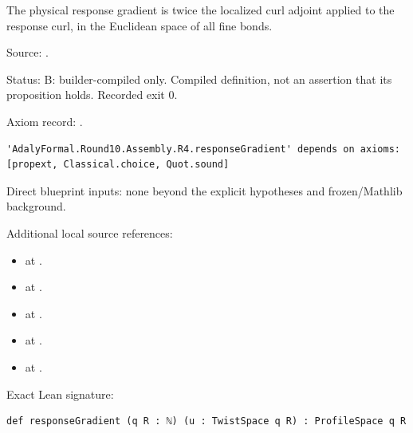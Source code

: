\begin{definition}[bp-168]
\label{bp-168}
\uses{}
\leanok
The physical response gradient is twice the localized curl adjoint applied to the response curl, in the Euclidean space of all fine bonds.

\par Source: \texttt{}.
\par Status: B: builder-compiled only. Compiled definition, not an assertion that its proposition holds. Recorded exit 0.
\par Axiom record: \texttt{}.
\begin{verbatim}
'AdalyFormal.Round10.Assembly.R4.responseGradient' depends on axioms: [propext, Classical.choice, Quot.sound]
\end{verbatim}
\par Direct blueprint inputs: none beyond the explicit hypotheses and frozen/Mathlib background.
\par Additional local source references:
\begin{itemize}
\item \texttt{} at \texttt{}.
\item \texttt{} at \texttt{}.
\item \texttt{} at \texttt{}.
\item \texttt{} at \texttt{}.
\item \texttt{} at \texttt{}.
\end{itemize}
\par Exact Lean signature:
\begin{verbatim}
def responseGradient (q R : ℕ) (u : TwistSpace q R) : ProfileSpace q R
\end{verbatim}
\end{definition}

